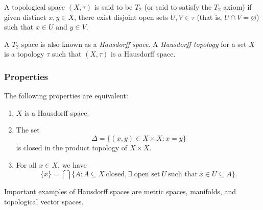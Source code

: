 \documentclass{article}
\def\emptyset{\varnothing}
\begin{document}
A topological space $(X,\tau)$ is said to be $T_2$ 
(or said to satisfy the $T_2$ axiom) if given 
distinct $x,y\in X$, there exist disjoint 
open sets $U,V\in\tau$ (that is, $U\cap V=\emptyset$) 
such that $x\in U$ and $y\in V$.

A $T_2$ space is also known as a \emph{Hausdorff space}.
A \emph{Hausdorff topology} for a set $X$ is a topology 
$\tau$ such that $(X,\tau)$ is a Hausdorff space.

\subsubsection*{Properties}
The following properties are equivalent:
\begin{enumerate}
\item $X$ is a Hausdorff space. 
\item The set 
$$
\Delta=\{(x,y)\in X\times X:x=y\}
$$
is closed in the product topology of $X\times X$.
\item For all $x\in X$, we have
$$
  \{x\} = \bigcap \{A : A\subseteq X\ \mbox{closed}, \mbox{$\exists$ open set}\  U\ \mbox{such that}\ x\in U\subseteq A\}.
$$
\end{enumerate}

Important examples of Hausdorff spaces are metric spaces, manifolds, 
and topological vector spaces.
\end{document}
